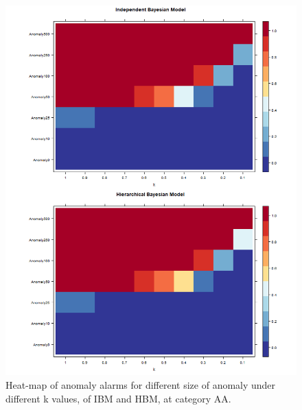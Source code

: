 
\newpage

\begin{figure}[!h]
	\centering
	\includegraphics[width=1\linewidth]{../../R-codes/JAGS/plots/sim1/heatAA}
	\caption{Heat-map of anomaly alarms for different size of anomaly under different k values, of IBM and HBM, at category AA.}
	\label{fig:heatAAab}
\end{figure}

\newpage

